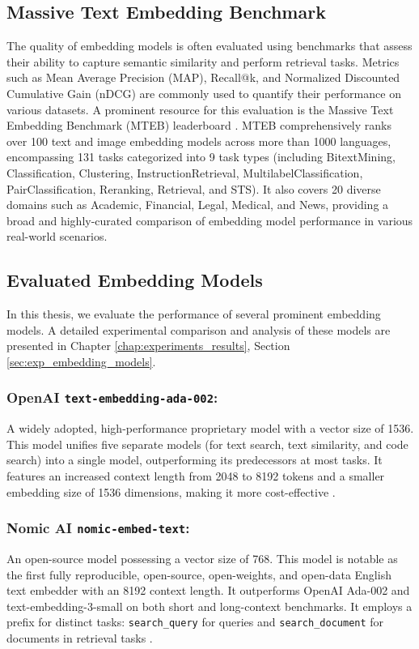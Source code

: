 \subsection{Massive Text Embedding Benchmark}
The quality of embedding models is often evaluated using benchmarks that assess their ability to capture semantic similarity and perform retrieval tasks. Metrics such as Mean Average Precision (MAP), Recall@k, and Normalized Discounted Cumulative Gain (nDCG) are commonly used to quantify their performance on various datasets. A prominent resource for this evaluation is the Massive Text Embedding Benchmark (MTEB) leaderboard \autocite{mteb_leaderboard_2025}. MTEB comprehensively ranks over 100 text and image embedding models across more than 1000 languages, encompassing 131 tasks categorized into 9 task types (including BitextMining, Classification, Clustering, InstructionRetrieval, MultilabelClassification, PairClassification, Reranking, Retrieval, and STS). It also covers 20 diverse domains such as Academic, Financial, Legal, Medical, and News, providing a broad and highly-curated comparison of embedding model performance in various real-world scenarios.
\subsection{Evaluated Embedding Models}
In this thesis, we evaluate the performance of several prominent embedding models.
A detailed experimental comparison and analysis of these models are presented in Chapter \ref{chap:experiments_results}, Section \ref{sec:exp_embedding_models}.

\subsubsection{OpenAI \texttt{text-embedding-ada-002}:} A widely adopted, high-performance proprietary model with a vector size of 1536. This model unifies five separate models (for text search, text similarity, and code search) into a single model, outperforming its predecessors at most tasks. It features an increased context length from 2048 to 8192 tokens and a smaller embedding size of 1536 dimensions, making it more cost-effective \autocite{openai2022ada002}.

\subsubsection{Nomic AI \texttt{nomic-embed-text}:} An open-source model possessing a vector size of 768. This model is notable as the first fully reproducible, open-source, open-weights, and open-data English text embedder with an 8192 context length. It outperforms OpenAI Ada-002 and text-embedding-3-small on both short and long-context benchmarks. It employs a prefix for distinct tasks: \texttt{search\_query} for queries and \texttt{search\_document} for documents in retrieval tasks \autocite{nussbaum2025nomicembedtrainingreproducible}.

